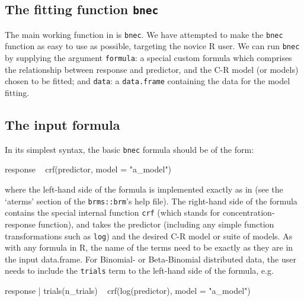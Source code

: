 \hypertarget{the-fitting-function-bnec}{%
\subsection{\texorpdfstring{The fitting function
\texttt{bnec}}{The fitting function bnec}}\label{the-fitting-function-bnec}}

The main working function in  is \texttt{bnec}. We have
attempted to make the \texttt{bnec} function as easy to use as possible,
targeting the novice R user. We can run \texttt{bnec} by supplying the
argument \texttt{formula}: a special custom formula which comprises the
relationship between response and predictor, and the C-R model (or
models) chosen to be fitted; and \texttt{data}: a \texttt{data.frame}
containing the data for the model fitting.

\hypertarget{the-input-formula}{%
\subsection{The input formula}\label{the-input-formula}}

In its simplest syntax, the basic \texttt{bnec} formula should be of the
form:

\begin{Schunk}
\begin{Sinput}
response ~ crf(predictor, model = "a_model")
\end{Sinput}
\end{Schunk}

where the left-hand side of the formula is implemented exactly as in
 (see the `aterms' section of the \texttt{brms::brm}'s help
file). The right-hand side of the formula contains the special internal
function \texttt{crf} (which stands for concentration-response
function), and takes the predictor (including any simple function
transformations such as \texttt{log}) and the desired C-R model or suite
of models. As with any formula in R, the name of the terms need to be
exactly as they are in the input data.frame. For Binomial- or
Beta-Binomial distributed data, the user needs to include the
\texttt{trials} term to the left-hand side of the formula, e.g.

\begin{Schunk}
\begin{Sinput}
response | trials(n_trials) ~ crf(log(predictor), model = "a_model")
\end{Sinput}
\end{Schunk}

